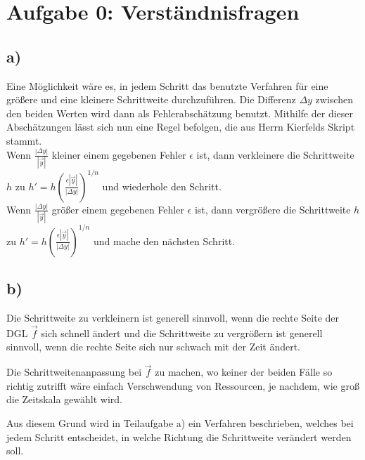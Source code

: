 \setcounter{secnumdepth}{0}
\section{Aufgabe 0: Verständnisfragen}
\label{sec:auf0}
\subsection*{a)}
    Eine Möglichkeit wäre es, in jedem Schritt das benutzte Verfahren für eine größere und eine kleinere Schrittweite durchzuführen.
    Die Differenz $\Delta y$ zwischen den beiden Werten wird dann als Fehlerabschätzung benutzt.
    Mithilfe der dieser Abschätzungen lässt sich nun eine Regel befolgen, die aus Herrn Kierfelds Skript stammt. \\[0.5cm]

    Wenn $\frac{|\Delta y|}{|\vec{y}|}$ kleiner einem gegebenen Fehler $\epsilon$ ist, dann verkleinere die Schrittweite $h$ zu $h' = h \left(\frac{\epsilon |\vec{y}|}{|\Delta y|}\right)^{1/n}$ und wiederhole den Schritt. \\[0.5cm]

    Wenn $\frac{|\Delta y|}{|\vec{y}|}$ größer einem gegebenen Fehler $\epsilon$ ist, dann vergrößere die Schrittweite $h$ zu $h' = h \left(\frac{\epsilon |\vec{y}|}{|\Delta y|}\right)^{1/n}$ und mache den nächsten Schritt.
    

\subsection*{b)}
    Die Schrittweite zu verkleinern ist generell sinnvoll, wenn die rechte Seite der DGL $\vec{f}$ sich schnell ändert und die Schrittweite zu vergrößern ist generell sinnvoll, wenn die rechte Seite sich  nur schwach mit der Zeit ändert.

    Die Schrittweitenanpassung bei $\vec{f}$ zu machen, wo keiner der beiden Fälle so richtig zutrifft wäre einfach Verschwendung von Ressourcen, je nachdem, wie groß die Zeitskala gewählt wird.

    Aus diesem Grund wird in Teilaufgabe a) ein Verfahren beschrieben, welches bei jedem Schritt entscheidet, in welche Richtung die Schrittweite verändert werden soll.